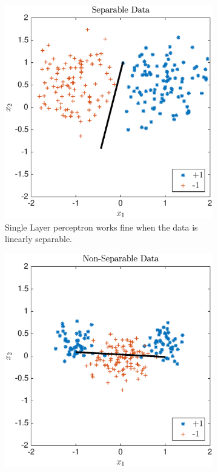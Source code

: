 \documentclass[letterpaper, 10 pt, conference]{ieeeconf}  %
\begin{document}
\begin{figure}
    \centering
    \begin{subfigure}[b]{0.49\textwidth}
        \includegraphics[width=\textwidth]{separable}
        \caption{Single Layer perceptron works fine when the data is linearly separable.}
        \label{fig:s}
    \end{subfigure}
    \begin{subfigure}[b]{0.49\textwidth}
        \includegraphics[width=\textwidth]{nonseparable}

\end{subfigure}
\end{figure}
\end{document}
